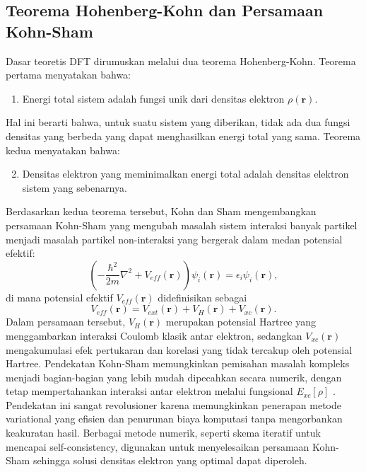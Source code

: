 \subsection{Teorema Hohenberg-Kohn dan Persamaan Kohn-Sham}
Dasar teoretis DFT dirumuskan melalui dua teorema Hohenberg-Kohn.
Teorema pertama menyatakan bahwa:
\begin{enumerate}
    \item Energi total sistem adalah fungsi unik dari densitas elektron \(\rho(\mathbf{r})\).
\end{enumerate}
Hal ini berarti bahwa, untuk suatu sistem yang diberikan, tidak ada dua fungsi densitas yang berbeda yang dapat menghasilkan energi total yang sama.
Teorema kedua menyatakan bahwa:
\begin{enumerate}
    \setcounter{enumi}{1}
    \item Densitas elektron yang meminimalkan energi total adalah densitas elektron sistem yang sebenarnya.
\end{enumerate}
Berdasarkan kedua teorema tersebut, Kohn dan Sham mengembangkan persamaan Kohn-Sham yang mengubah masalah sistem interaksi banyak partikel menjadi masalah partikel non-interaksi yang bergerak dalam medan potensial efektif:
\begin{equation}
    \left(-\frac{\hbar^2}{2m}\nabla^2 + V_{eff}(\mathbf{r})\right)\psi_i(\mathbf{r}) = \epsilon_i \psi_i(\mathbf{r}),
\end{equation}
di mana potensial efektif \(V_{eff}(\mathbf{r})\) didefinisikan sebagai
\begin{equation}
    V_{eff}(\mathbf{r}) = V_{ext}(\mathbf{r}) + V_H(\mathbf{r}) + V_{xc}(\mathbf{r}).
\end{equation}
Dalam persamaan tersebut, \(V_H(\mathbf{r})\) merupakan potensial Hartree yang menggambarkan interaksi Coulomb klasik antar elektron, sedangkan \(V_{xc}(\mathbf{r})\) mengakumulasi efek pertukaran dan korelasi yang tidak tercakup oleh potensial Hartree.
Pendekatan Kohn-Sham memungkinkan pemisahan masalah kompleks menjadi bagian-bagian yang lebih mudah dipecahkan secara numerik, dengan tetap mempertahankan interaksi antar elektron melalui fungsional \(E_{xc}[\rho]\) \citep{Kohn1965, Perdew1996}.
Pendekatan ini sangat revolusioner karena memungkinkan penerapan metode variational yang efisien dan penurunan biaya komputasi tanpa mengorbankan keakuratan hasil.
Berbagai metode numerik, seperti skema iteratif untuk mencapai self-consistency, digunakan untuk menyelesaikan persamaan Kohn-Sham sehingga solusi densitas elektron yang optimal dapat diperoleh.

